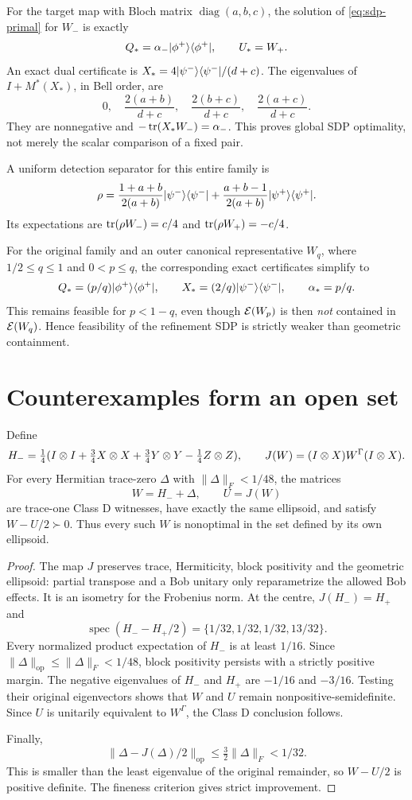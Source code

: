 For the target map with Bloch matrix $\operatorname{diag}(a,b,c)$, the solution of \eqref{eq:sdp-primal} for $W_-$ is exactly
\[
 Q_*=\alpha_-\lvert \phi^+\rangle\langle \phi^+\rvert,\qquad U_*=W_+.
\]
An exact dual certificate is $X_*=4\lvert \psi^-\rangle\langle \psi^-\rvert/(d+c)$. The eigenvalues of $I+M^*(X_*)$, in Bell order, are
\[
 0,\quad \frac{2(a+b)}{d+c},\quad \frac{2(b+c)}{d+c},\quad \frac{2(a+c)}{d+c}.
\]
They are nonnegative and $-\operatorname{tr}(X_*W_-)=\alpha_-$. This proves global SDP optimality, not merely the scalar comparison of a fixed pair.

A uniform detection separator for this entire family is
\[
 \rho=\frac{1+a+b}{2(a+b)}\lvert \psi^-\rangle\langle \psi^-\rvert
       +\frac{a+b-1}{2(a+b)}\lvert \psi^+\rangle\langle \psi^+\rvert.
\]
Its expectations are $\operatorname{tr}(\rho W_-)=c/4$ and $\operatorname{tr}(\rho W_+)=-c/4$.

For the original family and an outer canonical representative $W_q$, where $1/2\leq q\leq1$ and $0<p\leq q$, the corresponding exact certificates simplify to
\[
 Q_*=(p/q)\lvert \phi^+\rangle\langle \phi^+\rvert,\qquad X_*=(2/q)\lvert \psi^-\rangle\langle \psi^-\rvert,\qquad\alpha_*=p/q.
\]
This remains feasible for $p<1-q$, even though $\mathcal E(W_p)$ is then \emph{not} contained in $\mathcal E(W_q)$. Hence feasibility of the refinement SDP is strictly weaker than geometric containment.

\section{Counterexamples form an open set}

\begin{theorem}\label{thm:robust}
Define
\[
 H_-=\tfrac14(I\otimes I+\tfrac34X\otimes X+\tfrac34Y\otimes Y-\tfrac14Z\otimes Z),
 \qquad J(W)=(I\otimes X)W^\Gamma(I\otimes X).
\]
For every Hermitian trace-zero $\Delta$ with $\|\Delta\|_F<1/48$, the matrices
\[
 W=H_-+\Delta,\qquad U=J(W)
\]
are trace-one Class D witnesses, have exactly the same ellipsoid, and satisfy $W-U/2\succ0$. Thus every such $W$ is nonoptimal in the set defined by its own ellipsoid.
\end{theorem}
\begin{proof}
The map $J$ preserves trace, Hermiticity, block positivity and the geometric ellipsoid: partial transpose and a Bob unitary only reparametrize the allowed Bob effects. It is an isometry for the Frobenius norm. At the centre, $J(H_-)=H_+$ and
\[
 \operatorname{spec}(H_--H_+/2)=\{1/32,1/32,1/32,13/32\}.
\]
Every normalized product expectation of $H_-$ is at least $1/16$. Since $\|\Delta\|_{\mathrm{op}}\leq\|\Delta\|_F<1/48$, block positivity persists with a strictly positive margin. The negative eigenvalues of $H_-$ and $H_+$ are $-1/16$ and $-3/16$. Testing their original eigenvectors shows that $W$ and $U$ remain nonpositive-semidefinite. Since $U$ is unitarily equivalent to $W^\Gamma$, the Class D conclusion follows.

Finally,
\[
 \|\Delta-J(\Delta)/2\|_{\mathrm{op}}
 \leq\tfrac32\|\Delta\|_F<1/32.
\]
This is smaller than the least eigenvalue of the original remainder, so $W-U/2$ is positive definite. The fineness criterion gives strict improvement.
\end{proof}

